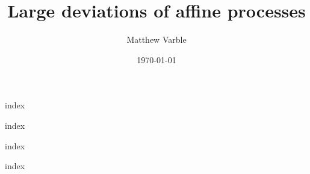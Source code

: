 \documentclass[leqno]{./preamble/dissertation}
\title{Large deviations of affine processes}
\author{Matthew Varble}
\date{\today}
\begin{document}
\maketitle

\frontmatter
{index}

\tableofcontents

{index}

\mainmatter
{index}

\appendix
{index}

\clearpage

\end{document}
